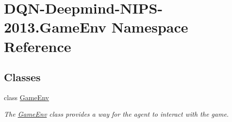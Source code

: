 \hypertarget{namespaceDQN-Deepmind-NIPS-2013_1_1GameEnv}{}\section{D\+Q\+N-\/\+Deepmind-\/\+N\+I\+P\+S-\/2013.Game\+Env Namespace Reference}
\label{namespaceDQN-Deepmind-NIPS-2013_1_1GameEnv}
\subsection*{Classes}
\begin{DoxyCompactItemize}
\item 
class \hyperlink{classDQN-Deepmind-NIPS-2013_1_1GameEnv_1_1GameEnv}{Game\+Env}
\begin{DoxyCompactList}\small\item\em The \hyperlink{classDQN-Deepmind-NIPS-2013_1_1GameEnv_1_1GameEnv}{Game\+Env} class provides a way for the agent to interact with the game. \end{DoxyCompactList}\end{DoxyCompactItemize}

